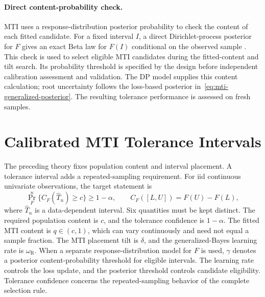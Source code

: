 \documentclass[11pt]{article}
\numberwithin{equation}{section}
\begin{document}
\paragraph{Direct content-probability check.}
MTI uses a response-distribution posterior probability to check the content
of each fitted candidate. For a fixed interval \(I\), a direct
Dirichlet-process posterior for
\(F\) gives an exact Beta law for \(F(I)\) conditional on the observed sample
\citep{Ferguson1973DP}. This check is used to select eligible MTI
candidates during the fitted-content and tilt search. Its probability threshold
is specified by the design before independent calibration assessment and
validation. The DP model supplies this content calculation; root uncertainty
follows the loss-based posterior in~\eqref{eq:mti-generalized-posterior}.
The resulting tolerance performance is assessed on fresh samples.

\section{Calibrated MTI Tolerance Intervals}
\label{sec:mti-tolerance}

The preceding theory fixes population content and interval placement. A
tolerance interval adds a repeated-sampling requirement. For iid continuous
univariate observations, the target statement is
\[
\Pr_F^n\{C_F(\widehat T_n)\ge c\}\ge 1-\alpha,\qquad
C_F([L,U])=F(U)-F(L),
\]
where \(\widehat T_n\) is a data-dependent interval. Six quantities must be
kept distinct. The required population content is \(c\), and the tolerance
confidence is \(1-\alpha\). The fitted MTI content is \(q\in(c,1)\),
which can vary continuously and need not equal a sample fraction. The MTI
placement tilt is \(\delta\), and the
generalized-Bayes learning rate is \(\omega_{\mathrm R}\). When a separate
response-distribution model for \(F\) is used, \(\gamma\) denotes a posterior
content-probability threshold for eligible intervals. The learning rate controls
the loss update, and the posterior threshold controls candidate eligibility.
Tolerance confidence concerns the repeated-sampling behavior of the complete
selection rule.
\end{document}

